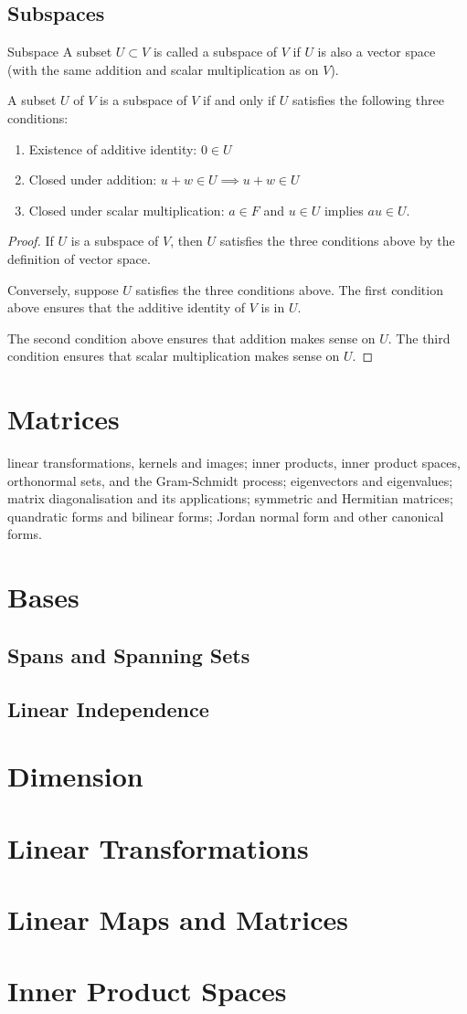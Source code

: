 \section{Subspaces}
\begin{defn}{Subspace}{}
A subset $U \subset V$ is called a subspace of $V$ if $U$ is also a vector space (with the same addition and scalar multiplication as on $V$).
\end{defn}

A subset $U$ of $V$ is a subspace of $V$ if and only if $U$ satisfies the following three conditions:
\begin{enumerate}
\item Existence of additive identity: $0 \in U$
\item Closed under addition: $u+w \in U \implies u+w \in U$
\item Closed under scalar multiplication: $a \in F$ and $u \in U$ implies $au \in U$.
\end{enumerate}
\begin{proof}
If $U$ is a subspace of $V$, then $U$ satisfies the three conditions above by the definition of vector space.

Conversely, suppose $U$ satisfies the three conditions above. The first condition above ensures that the additive identity of $V$ is in $U$.

The second condition above ensures that addition makes sense on $U$. The third condition ensures that scalar multiplication makes sense on $U$.
\end{proof}

\chapter{Matrices}

linear transformations, kernels and images; inner products, inner product spaces, orthonormal sets, and the Gram-Schmidt process; eigenvectors and eigenvalues; matrix diagonalisation and its applications; symmetric and Hermitian matrices; quandratic forms and bilinear forms; Jordan normal form and other canonical forms.

\chapter{Bases}
\section{Spans and Spanning Sets}
\section{Linear Independence}

\chapter{Dimension}

\chapter{Linear Transformations}

\chapter{Linear Maps and Matrices}

\chapter{Inner Product Spaces}
